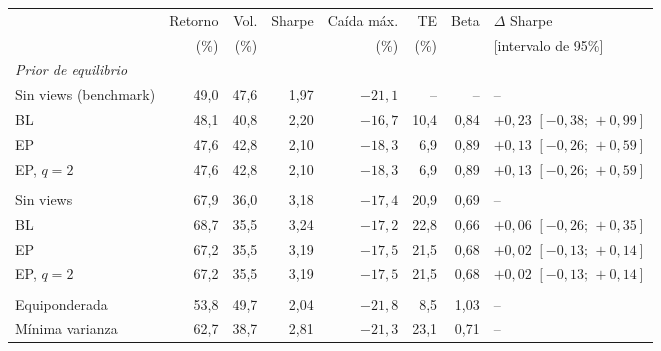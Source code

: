 \begin{tabular}{lrrrrrrl}
\toprule
 & Retorno & Vol. & Sharpe & Ca\'ida m\'ax. & TE & Beta & $\Delta$ Sharpe \\
 & (\%) & (\%) & & (\%) & (\%) & & [intervalo de 95\%] \\
\midrule
\multicolumn{8}{l}{\emph{Prior de equilibrio}} \\
\quad Sin views (benchmark) & 49{,}0 & 47{,}6 & 1{,}97 & $-21{,}1$ & -- & -- & -- \\
\quad BL & 48{,}1 & 40{,}8 & 2{,}20 & $-16{,}7$ & 10{,}4 & 0{,}84 & $+0{,}23$ $[-0{,}38;\, +0{,}99]$ \\
\quad EP & 47{,}6 & 42{,}8 & 2{,}10 & $-18{,}3$ & 6{,}9 & 0{,}89 & $+0{,}13$ $[-0{,}26;\, +0{,}59]$ \\
\quad EP, $q=2$ & 47{,}6 & 42{,}8 & 2{,}10 & $-18{,}3$ & 6{,}9 & 0{,}89 & $+0{,}13$ $[-0{,}26;\, +0{,}59]$ \\
\addlinespace
\multicolumn{8}{l}{\emph{Prior hist\'orico}} \\
\quad Sin views & 67{,}9 & 36{,}0 & 3{,}18 & $-17{,}4$ & 20{,}9 & 0{,}69 & -- \\
\quad BL & 68{,}7 & 35{,}5 & 3{,}24 & $-17{,}2$ & 22{,}8 & 0{,}66 & $+0{,}06$ $[-0{,}26;\, +0{,}35]$ \\
\quad EP & 67{,}2 & 35{,}5 & 3{,}19 & $-17{,}5$ & 21{,}5 & 0{,}68 & $+0{,}02$ $[-0{,}13;\, +0{,}14]$ \\
\quad EP, $q=2$ & 67{,}2 & 35{,}5 & 3{,}19 & $-17{,}5$ & 21{,}5 & 0{,}68 & $+0{,}02$ $[-0{,}13;\, +0{,}14]$ \\
\addlinespace
\multicolumn{8}{l}{\emph{Carteras de referencia}} \\
\quad Equiponderada & 53{,}8 & 49{,}7 & 2{,}04 & $-21{,}8$ & 8{,}5 & 1{,}03 & -- \\
\quad M\'inima varianza & 62{,}7 & 38{,}7 & 2{,}81 & $-21{,}3$ & 23{,}1 & 0{,}71 & -- \\
\bottomrule
\end{tabular}
